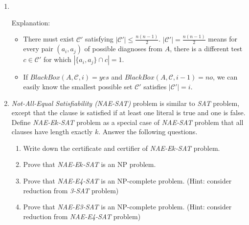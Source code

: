 \documentclass[12pt,a4paper]{article}
\makeatletter
\newtheorem*{solution}{Solution}
\theoremstyle{definition}
\renewenvironment{solution}[1][Solution] {\par\pushQED{\qed}\normalfont\topsep6\p@\@plus6\p@\relax\trivlist\item[\hskip\labelsep\bfseries#1\@addpunct{.}]\ignorespaces}{\popQED\endtrivlist\@endpefalse} \makeatother
\makeatother
\begin{document}
\begin{enumerate}
    \begin{solution}
    	\quad \\
        \begin{algorithm}[H]
        	\BlankLine
        	\caption{$MTC\_Search(A,\mathcal{C})$} \label{Alg-MTC}
        \end{algorithm}
    \end{solution}
	Explanation: 
	\begin{itemize}
		\item There must exist $\mathcal{C}'$ satisfying $\left|\mathcal{C}'\right|\leq \frac{n(n-1)}{2}$. $\left|\mathcal{C}'\right|= \frac{n(n-1)}{2}$ means for every pair $(a_i, a_j)$ of possible diagnoses from $A$, there is a different test $c\in \mathcal{C}'$ for which $\left|\{a_i, a_j\}\cap c\right| = 1$. 
		\item If $BlackBox(A, \mathcal{C}, i) = yes$ and $BlackBox(A, \mathcal{C}, i-1) = no$, we can easily know the smallest possible set $\mathcal{C}'$ satisfies $\left|\mathcal{C}'\right| = i$. 
	\end{itemize}
	
	
	\item \textit{Not-All-Equal Satisfiability (NAE-SAT)} problem is similar to \textit{SAT} problem, except that the clause is satisfied if at least one literal is true and one is false. Define \textit{NAE-E$k$-SAT} problem as a special case of \textit{NAE-SAT} problem that all clauses have length exactly $k$. Answer the following questions.
	\begin{enumerate}
		\item Write down the certificate and certifier of \textit{NAE-E$k$-SAT} problem.
		\item Prove that \textit{NAE-E$k$-SAT} is an NP problem.
		\item Prove that \textit{NAE-E4-SAT} is an NP-complete problem. {\color{blue}(Hint: consider reduction from \textit{3-SAT} problem)}
		\item Prove that \textit{NAE-E3-SAT} is an NP-complete problem. {\color{blue}(Hint: consider reduction from \textit{NAE-E4-SAT} problem)}
	\end{enumerate}


\end{enumerate}
\end{document}
